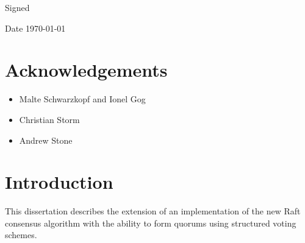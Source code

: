 \documentclass[draft,11pt,chapterprefix=true,toc=bibliography,numbers=noendperiod,
               footnotes=multiple,twoside]{scrreprt}
\begin{document}
\vspace{0.3in}
Signed

\vspace{0.2in}
Date \hspace{0.4in} \today

\chapter*{Acknowledgements\label{ch:acknowledgements}}

\begin{itemize}
    \item Malte Schwarzkopf and Ionel Gog
    \item Christian Storm
    \item Andrew Stone
\end{itemize}

\tableofcontents



\chapter{Introduction\label{ch:introduction}}


This dissertation describes the extension of an implementation of the new Raft consensus algorithm with the ability to form quorums using structured voting schemes.


\end{document}
